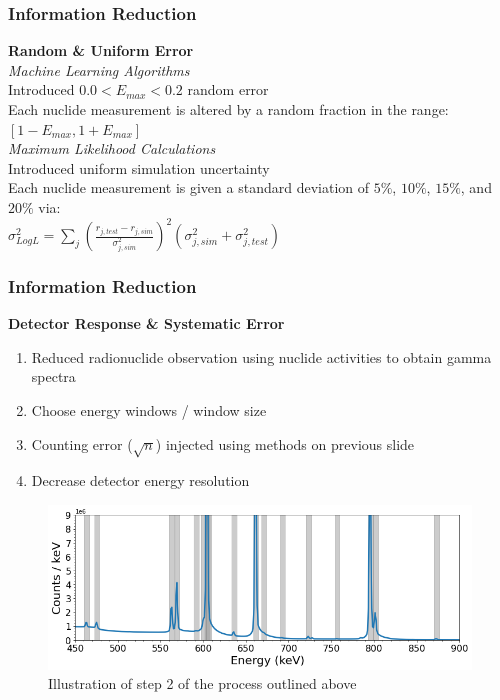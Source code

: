 \begin{frame}
  \frametitle{Information Reduction}
  \textbf{\large Random \& Uniform Error} \\
  \bigskip
  \textit{Machine Learning Algorithms} \\ \medskip
  Introduced $0.0 < E_{max} < 0.2$ random error\\ \smallskip
  Each nuclide measurement is altered by a random fraction in the range: $[1-E_{max},1+E_{max}]$\\
  \bigskip
  \textit{Maximum Likelihood Calculations} \\ \medskip
  Introduced uniform simulation uncertainty\\ \smallskip
  Each nuclide measurement is given a standard deviation of $5\%$, $10\%$, $15\%$, and $20\%$ via: \\
  $\sigma_{Log L}^2 = \sum_j \left( \frac{r_{j,test} - r_{j,sim}}{\sigma_{j,sim}^2} \right)^2 (\sigma_{j,sim}^2 + \sigma_{j,test}^2)$
\end{frame}

\begin{frame}
  \frametitle{Information Reduction}
  \textbf{\large Detector Response \& Systematic Error} \\
  \medskip
  \begin{enumerate}
    \item Reduced radionuclide observation using nuclide activities to obtain gamma spectra
    \item Choose energy windows / window size
    \item Counting error ($\sqrt{n}$) injected using methods on previous slide
    \item Decrease detector energy resolution
  \end{enumerate}
  \begin{figure}[h!]
    \centering
    \includegraphics[height=0.4\textheight]{./figures/energy_window_example.png}
    \caption{Illustration of step 2 of the process outlined above}
  \end{figure}
\end{frame}
